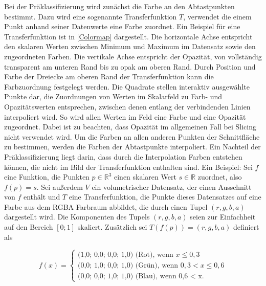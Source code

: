 \documentclass[a4paper,fontsize=12pt,toc=bib,parskip=half,ngerman]{scrartcl}
\begin{document}
Bei der Pr\"aklassifizierung wird zun\"achst die Farbe  an den Abtastpunkten bestimmt. Dazu wird eine sogenannte \glq Transferfunktion\grq{} $T$, verwendet die einem Punkt anhand seiner Datenwerte eine Farbe zuordnet. Ein Beispiel f\"ur eine Transferfunktion ist in \cref{Colormap} dargestellt. Die horizontale Achse entspricht den skalaren Werten zwischen Minimum und Maximum im Datensatz sowie den zugeordneten Farben. Die vertikale Achse entspricht der Opazit\"at, von vollst\"andig transparent am unteren Rand bis zu opak am oberen Rand. Durch Position und Farbe der Dreiecke am oberen Rand der Transferfunktion kann die Farbzuordnung festgelegt werden. Die Quadrate stellen interaktiv ausgew\"ahlte Punkte dar, die Zuordnungen von Werten im Skalarfeld zu Farb- und Opazit\"atswerten entsprechen, zwischen denen entlang der verbindenden Linien interpoliert wird. So wird allen Werten im Feld eine Farbe und eine Opazit\"at zugeordnet. Dabei ist zu beachten, dass Opazit\"at im allgemeinen Fall bei Slicing nicht verwendet wird. Um die Farben an allen anderen Punkten der Schnittfl\"ache zu bestimmen, werden die Farben der Abtastpunkte interpoliert. Ein Nachteil der Pr\"aklassifizierung liegt darin, dass durch die Interpolation Farben entstehen k\"onnen, die nicht im Bild der Transferfunktion enthalten sind. Ein Beispiel: Sei $f$ eine Funktion, die Punkten $p \in \mathbb{R}^3$ einen skalaren Wert $s \in \mathbb{R}$ zuordnet, also $f(p) = s$. Sei au{\ss}erdem $V$ ein volumetrischer Datensatz, der einen Ausschnitt von $f$ enth\"alt und $T$ eine Transferfunktion, die Punkte dieses Datensatzes auf eine Farbe aus dem RGBA Farbraum abbildet, die durch einen Tupel $(r,g,b,a)$ dargestellt wird. Die Komponenten des Tupels $(r,g,b,a)$ seien zur Einfachheit auf den Bereich $[0;1]$ skaliert. Zus\"atzlich sei $T(f(p)) = (r,g,b,a)$ definiert als 

\begin{equation}
	f(x)= 
	\begin{cases}
		\text{(1,0; 0,0; 0,0; 1,0) (Rot), wenn } x\leq 0,3\\
		\text{(0,0; 1,0; 0,0; 1,0) (Gr\"un), wenn } 0,3 < x\leq 0,6\\
		\text{(0,0; 0,0; 1,0; 1,0) (Blau), wenn 0,6 < x}.
	\end{cases}
\end{equation}
\end{document}
